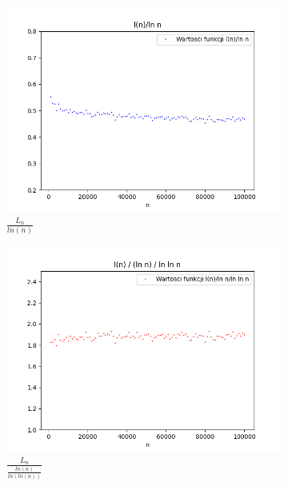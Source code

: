 \documentclass{report}
\begin{document}
    \begin{figure}[H]
        \centering
        \begin{subfigure}{.5\textwidth}
          \centering
          \includegraphics[width=1.1\linewidth]{plotlnfunc1.png}
          \caption{\( \frac{L_n}{ln(n)} \)}
          \label{fig:plotlnfunc1}
        \end{subfigure}%
        \begin{subfigure}{.5\textwidth}
          \centering
          \includegraphics[width=1.1\linewidth]{plotlnfunc2.png}
          \caption{\( \frac{L_n}{\frac{ln(n)}{ln(ln(n))}} \)}
          \label{fig:plotlnfunc2}
        \end{subfigure}
        \begin{subfigure}{.5\textwidth}

\end{subfigure}
\end{figure}
\end{document}
